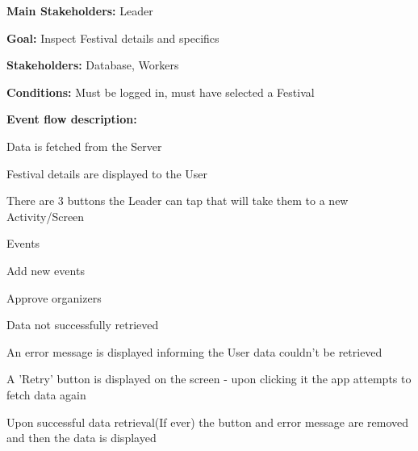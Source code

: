 				\noindent {}
				\begin{packed_item}
					\item \textbf{Main Stakeholders:} Leader
					\item \textbf{Goal:} Inspect Festival details and specifics
					\item \textbf{Stakeholders: } Database, Workers
					\item \textbf{Conditions: } Must be logged in, must have selected a Festival
					\item \textbf{Event flow description: }
					\begin{packed_enum}
						\item Data is fetched from the Server
						\item Festival details are displayed to the User
						\item There are 3 buttons the Leader can tap that will take them to a new Activity/Screen
						\item[] \begin{packed_enum}
							\item Events
							\item Add new events
							\item Approve organizers
						\end{packed_enum}
					\end{packed_enum}
				
					\begin{packed_item}
						\item[1.a] Data not successfully retrieved
						\item[] \begin{packed_enum}
							\item An error message is displayed informing the User data couldn't be retrieved
							\item A 'Retry' button is displayed on the screen - upon clicking it the app attempts to fetch data again
							\item Upon successful data retrieval(If ever) the button and error message are removed and then the data is displayed
						\end{packed_enum}
					\end{packed_item}
			\end{packed_item}
		
